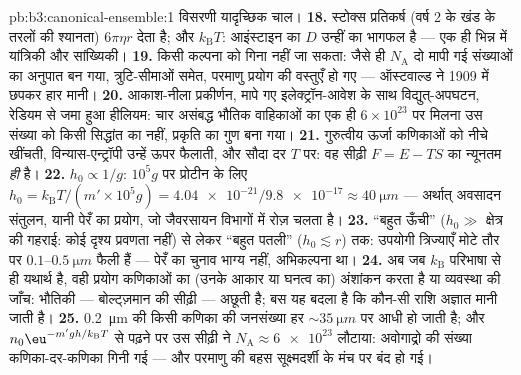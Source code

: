 \begin{solution}{pb:b3:canonical-ensemble:1}
विसरणी यादृच्छिक चाल।
\textbf{18.} स्टोक्स प्रतिकर्ष (वर्ष 2 के खंड के तरलों की श्यानता)
$6\pi\eta r$ देता है; और 
$k_{\text{B}}T$: आइंस्टाइन का $D$ उन्हीं का भागफल है --- एक ही भिन्न
में यांत्रिकी और सांख्यिकी।
\textbf{19.} किसी कल्पना को गिना नहीं जा सकता: जैसे ही $N_{\text{A}}$
दो मापी गई संख्याओं का अनुपात बन गया, त्रुटि-सीमाओं समेत, परमाणु
प्रयोग की वस्तुएँ हो गए --- ऑस्टवाल्ड ने 1909 में छपकर हार मानी।
\textbf{20.} आकाश-नीला प्रकीर्णन, मापे गए इलेक्ट्रॉन-आवेश के साथ
विद्युत्-अपघटन, रेडियम से जमा हुआ हीलियम: चार असंबद्ध
भौतिक वाहिकाओं का एक ही $6\times10^{23}$ पर मिलना उस संख्या को किसी
सिद्धांत का नहीं, प्रकृति का गुण बना गया।
\textbf{21.} गुरुत्वीय ऊर्जा कणिकाओं को नीचे खींचती, विन्यास-एन्ट्रॉपी
उन्हें ऊपर फैलाती, और सौदा दर $T$ पर:
वह सीढ़ी $F = E - TS$ का न्यूनतम \emph{ही} है।
\textbf{22.} $h_0 \propto 1/g$: $10^5g$ पर प्रोटीन के लिए
$h_0 = k_{\text{B}}T/(m'\times10^5g) = \num{4.04e-21}/
\num{9.8e-17} \approx \qty{40}{\micro m}$ ---
अर्थात् अवसादन संतुलन, यानी पेरँ का प्रयोग, जो जैवरसायन विभागों में
रोज़ चलता है।
\textbf{23.} ``बहुत ऊँची'' ($h_0 \gg$ क्षेत्र की गहराई: कोई दृश्य
प्रवणता नहीं) से लेकर ``बहुत पतली'' ($h_0 \lesssim r$) तक: उपयोगी
त्रिज्याएँ मोटे तौर पर $0.1$--$\qty{0.5}{\micro m}$ फैली हैं ---
पेरँ का चुनाव भाग्य नहीं, अभिकल्पना था।
\textbf{24.} अब जब $k_{\text{B}}$ परिभाषा से ही यथार्थ है, वही
प्रयोग कणिकाओं का (उनके आकार या घनत्व का) अंशांकन करता है या
व्यवस्था की जाँच: भौतिकी --- बोल्ट्ज़मान की सीढ़ी --- अछूती है;
बस यह बदला है कि कौन-सी राशि अज्ञात मानी जाती है।
\textbf{25.} \qty{0.2}{\micro m} की किसी कणिका की जनसंख्या हर
$\sim\qty{35}{\micro m}$ पर आधी हो जाती है; और $n_0\eu^{-m'gh/k_{\text{B}}
T}$ से पढ़ने पर उस सीढ़ी ने $N_{\text{A}} \approx \num{6e23}$ लौटाया:
अवोगाद्रो की संख्या कणिका-दर-कणिका गिनी गई --- और परमाणु की बहस
सूक्ष्मदर्शी के मंच पर बंद हो गई।
\end{solution}
